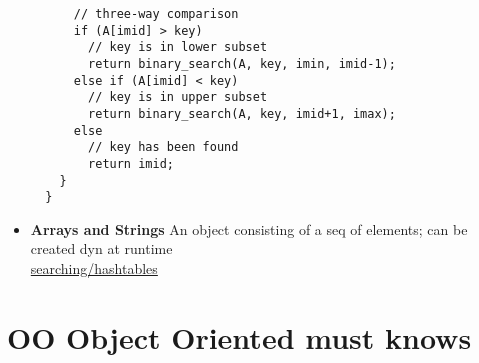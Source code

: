\documentclass[letterpaper]{article}
\begin{document}
\begin{itemize}
\begin{lstlisting}
      // three-way comparison
      if (A[imid] > key)
        // key is in lower subset
        return binary_search(A, key, imin, imid-1);
      else if (A[imid] < key)
        // key is in upper subset
        return binary_search(A, key, imid+1, imax);
      else
        // key has been found
        return imid;
    }
  }
  \end{lstlisting}


\item{\bf Arrays and Strings}
  An object consisting of a seq of elements; can be created dyn at runtime\\
\href{http://www.sparknotes.com/cs/searching/hashtables/section3.rhtml}{searching/hashtables}



\end{itemize}
\section{OO Object Oriented must knows}
\end{document}

